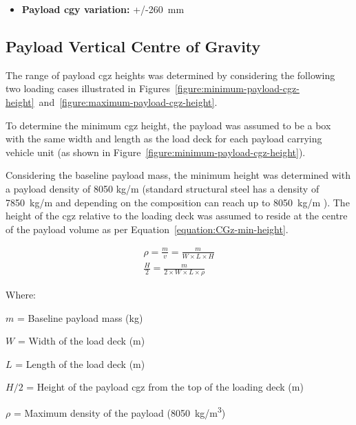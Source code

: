 \begin{itemize}
	\item \textbf{Payload \gls{cgy} variation:} +/-260~mm
\end{itemize}

\subsection{Payload Vertical Centre of Gravity}\label{section:pr-cgz-payload}

The range of payload \gls{cgz} heights was determined by considering the following two loading cases illustrated in Figures~\ref{figure:minimum-payload-cgz-height}~and~\ref{figure:maximum-payload-cgz-height}.

To determine the minimum \gls{cgz} height, the payload was assumed to be a box with the same width and length as the load deck for each payload carrying vehicle unit (as shown in Figure~\ref{figure:minimum-payload-cgz-height}). 

Considering the baseline payload mass, the minimum height was determined with a payload density of 8050 kg/m\ssth{} (standard structural steel has a density of 7850~kg/m\ssth{} and depending on the composition can reach up to 8050~kg/m\ssth{} \cite{ThyssenkruppAerospace}). The height of the \gls{cgz} relative to the loading deck was assumed to reside at the centre of the payload volume as per Equation~\ref{equation:CGz-min-height}.

\begin{align}
	\rho = \frac{m}{v}=\frac{m}{W \times L \times  H}\\
	\label{equation:CGz-min-height}
	\frac{H}{2} = \frac{m}{2 \times W \times L \times \rho}
\end{align}

Where:

$m$ = Baseline payload mass (kg)

$W$ = Width of the load deck (m)

$L$ = Length of the load deck (m)

$H/2$ = Height of the payload \gls{cgz} from the top of the loading deck (m)

$\rho$ = Maximum density of the payload  (8050~kg/m\textsuperscript{3})



